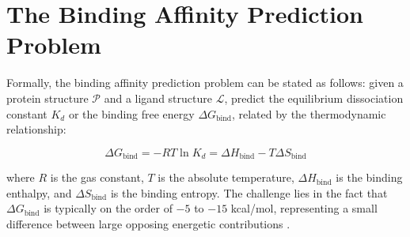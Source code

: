 \section{The Binding Affinity Prediction Problem}

Formally, the binding affinity prediction problem can be stated as follows: given a protein structure $\mathcal{P}$ and a ligand structure $\mathcal{L}$, predict the equilibrium dissociation constant $K_d$ or the binding free energy $\Delta G_{\text{bind}}$, related by the thermodynamic relationship:

\begin{equation}\label{eq:thermo}
\Delta G_{\text{bind}} = -RT \ln K_d = \Delta H_{\text{bind}} - T\Delta S_{\text{bind}}
\end{equation}

where $R$ is the gas constant, $T$ is the absolute temperature, $\Delta H_{\text{bind}}$ is the binding enthalpy, and $\Delta S_{\text{bind}}$ is the binding entropy. The challenge lies in the fact that $\Delta G_{\text{bind}}$ is typically on the order of $-5$ to $-15$ kcal/mol, representing a small difference between large opposing energetic contributions \cite{Mobley2010}.
